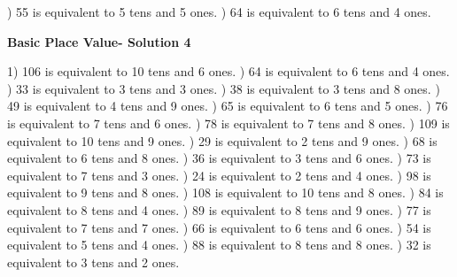 \documentclass{article}%
\begin{document}
) 55 is equivalent to  5 tens and 5 ones.%
) 64 is equivalent to  6 tens and 4 ones.%
\newline%
\newpage%
\large%
\begin{center}%
\textbf{Basic Place Value- Solution 4}%
\newline%
\end{center} \normalsize%
1) 106 is equivalent to  10 tens and 6 ones.%
) 64 is equivalent to  6 tens and 4 ones.%
) 33 is equivalent to  3 tens and 3 ones.%
) 38 is equivalent to  3 tens and 8 ones.%
) 49 is equivalent to  4 tens and 9 ones.%
) 65 is equivalent to  6 tens and 5 ones.%
) 76 is equivalent to  7 tens and 6 ones.%
) 78 is equivalent to  7 tens and 8 ones.%
) 109 is equivalent to  10 tens and 9 ones.%
) 29 is equivalent to  2 tens and 9 ones.%
) 68 is equivalent to  6 tens and 8 ones.%
) 36 is equivalent to  3 tens and 6 ones.%
) 73 is equivalent to  7 tens and 3 ones.%
) 24 is equivalent to  2 tens and 4 ones.%
) 98 is equivalent to  9 tens and 8 ones.%
) 108 is equivalent to  10 tens and 8 ones.%
) 84 is equivalent to  8 tens and 4 ones.%
) 89 is equivalent to  8 tens and 9 ones.%
) 77 is equivalent to  7 tens and 7 ones.%
) 66 is equivalent to  6 tens and 6 ones.%
) 54 is equivalent to  5 tens and 4 ones.%
) 88 is equivalent to  8 tens and 8 ones.%
) 32 is equivalent to  3 tens and 2 ones.%
\end{document}
